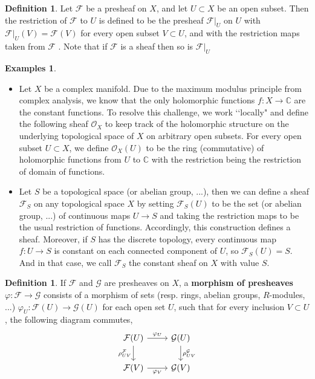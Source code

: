 \documentclass{article}
\theoremstyle{plain}
\theoremstyle{definition}
\newtheorem{definition}[theorem]{Definition}
\newtheorem{examples}[theorem]{Examples}
\begin{document}
\begin{definition}
    Let $\mathcal{F}$ be a presheaf on $X$, and let $U \subset X$ be an open subset. Then the restriction of $\mathcal{F}$ to $U$ is defined to be the presheaf $\mathcal{F}\vert_U$ on $U$ with $\mathcal{F}\vert_U(V) = \mathcal{F}(V)$ for every open subset $V\subset U$, and with the restriction maps taken from $\mathcal{F}$ . Note that if $\mathcal{F}$ is a sheaf then so is $\mathcal{F}\vert_U$
\end{definition}

\begin{examples}\textbf{ }
    \begin{itemize}
        \item[$a)$] Let $X$ be a complex manifold. 
        Due to the maximum modulus principle from complex analysis, we know that the only holomorphic functions $f:X\rightarrow \mathbb{C}$ are the constant functions. 
        To resolve this challenge, we work ‘‘locally" and define the following sheaf $\mathcal{O}_X$ to keep track of the holomorphic structure on the underlying topological space of $X$ on arbitrary open subsets. 
        For every open subset $U\subset X$, we define $\mathcal{O}_X(U)$ to be the ring (commutative) of holomorphic functions from $U$ to $\mathbb{C}$ with the restriction being the restriction of domain of functions.
        
        \item[$b)$] Let $S$ be a topological space (or abelian group, ...), then we can define a sheaf $\mathcal{F}_S$ on any topological space $X$ by setting $\mathcal{F}_S(U)$ to be the set (or abelian group, ...) of continuous maps $U\rightarrow S$ and taking the restriction maps to be the usual restriction of functions. Accordingly, this construction defines a sheaf. Moreover, if $S$ has the discrete topology, every continuous map $f:U\rightarrow S$ is constant on each connected component of $U$, so $\mathcal{F}_S(U) = S$. And in that case, we call $\mathcal{F}_S$ the constant sheaf on $X$ with value $S$.
    \end{itemize} 
\end{examples}

\begin{definition}
    If $\mathcal{F}$ and $\mathcal{G}$ are presheaves on $X$, a \textbf{morphism of presheaves} $\varphi : \mathcal{F}\rightarrow\mathcal{G}$ consists of a morphism of sets (resp. rings, abelian groups, $R$-modules, ...) $\varphi_U : \mathcal{F}(U)\rightarrow\mathcal{G}(U)$ for each open set $U$, such that for every inclusion $V\subset U$, the following diagram commutes,\\
    \[
    \begin{tikzcd}
        \mathcal{F}(U) \arrow[r,"\varphi_U"] \arrow[d, "\rho^{\mathcal{F}}_{UV}"']
        & \mathcal{G}(U) \arrow[d,"\rho^{\mathcal{G}}_{UV}"] \\
        \mathcal{F}(V) \arrow[r,"\varphi_V"']
        &  \mathcal{G}(V)
    \end{tikzcd}
    \]
\end{definition}
\end{document}

